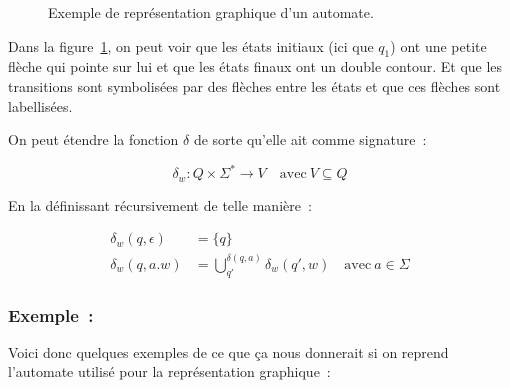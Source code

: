 \documentclass[12pt]{article}
\begin{document}
\begin{figure}[H]
    \centering
    \caption{
        Exemple de représentation graphique d'un automate.
    }\label{fig:automata}
\end{figure}

Dans la figure~\ref{fig:automata}, on peut voir que les états initiaux (ici que
\(q_1\)) ont une petite flèche qui pointe sur lui et que les états finaux ont
un double contour. Et que les transitions sont symbolisées par des flèches
entre les états et que ces flèches sont labellisées.

\vphantom{}

On peut étendre la fonction \(\delta\) de sorte qu'elle ait comme signature~:

\[
    \delta_w: Q \times \Sigma^* \to V \quad \text{avec}~ V \subseteq Q
\]

En la définissant récursivement de telle manière~:

\begin{align}
    \delta_w(q, \epsilon) & = \{q\}                                                                       \\
    \delta_w(q, a.w)      & = \bigcup_{q'}^{\delta(q, a)} \delta_w(q', w) \quad \text{avec}~ a \in \Sigma
\end{align}

\subsubsection*{Exemple~:}

Voici donc quelques exemples de ce que ça nous donnerait si on reprend
l'automate utilisé pour la représentation graphique~:
\end{document}
